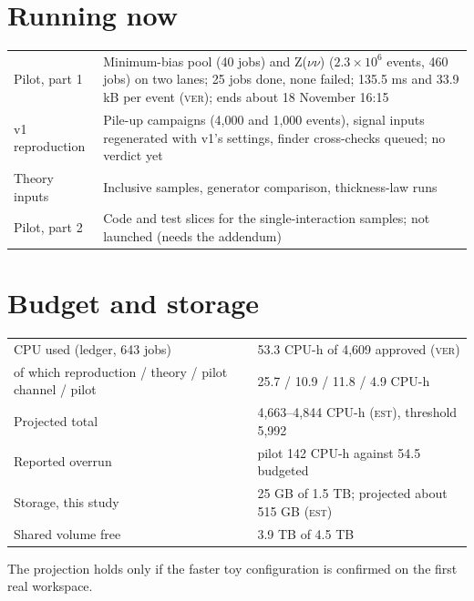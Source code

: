 \documentclass[11pt,a4paper]{article}
\newcommand{\est}{\textsc{est}}
\newcommand{\ver}{\textsc{ver}}
\begin{document}
\section{Running now}
\begin{center}
\begin{tabular}{L{3.6cm}L{10.6cm}}
\toprule
Pilot, part 1 & Minimum-bias pool (40 jobs) and Z($\nu\nu$) ($2.3\times10^{6}$ events, 460 jobs) on two lanes;
                25 jobs done, none failed; 135.5 ms and 33.9 kB per event (\ver); ends about 18 November 16:15 \\
v1 reproduction & Pile-up campaigns (4{,}000 and 1{,}000 events), signal inputs regenerated with v1's settings,
                  finder cross-checks queued; no verdict yet \\
Theory inputs & Inclusive samples, generator comparison, thickness-law runs \\
Pilot, part 2 & Code and test slices for the single-interaction samples; not launched (needs the addendum) \\
\bottomrule
\end{tabular}
\end{center}

\section{Budget and storage}
\begin{center}
\begin{tabular}{L{7.6cm}L{6.4cm}}
\toprule
CPU used (ledger, 643 jobs) & 53.3 CPU-h of 4{,}609 approved (\ver) \\
\quad of which reproduction / theory / pilot channel / pilot & 25.7 / 10.9 / 11.8 / 4.9 CPU-h \\
Projected total & 4{,}663--4{,}844 CPU-h (\est), threshold 5{,}992 \\
Reported overrun & pilot 142 CPU-h against 54.5 budgeted \\
Storage, this study & 25 GB of 1.5 TB; projected about 515 GB (\est) \\
Shared volume free & 3.9 TB of 4.5 TB \\
\bottomrule
\end{tabular}
\end{center}
The projection holds only if the faster toy configuration is confirmed on the first real workspace.
\end{document}
